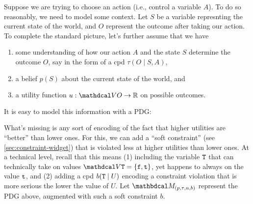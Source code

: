 Suppose we are trying to choose an action (i.e., control a variable $A$). 
To do so reasonably, we need to model some context. 
Let $S$ be a variable represnting the current state of the world,
and $O$ represent the outcome after taking our action. 
%
To complete the standard picture, let's further assume that 
 we have 
\begin{enumerate}[nosep]
\item 
    some understanding of how our action $A$ and the state $S$ determine the outcome $O$, say in the form of a cpd $\tau(O \mid S,A)$, 
\item 
a belief $p(S)$ about the current state of the world,
and 
\item  a utility function $u : \V O \to \mathbb R$ on possible outcomes. 
\end{enumerate}
It is easy to model this information with a PDG:

\begin{center}
\end{center}


What's missing is any sort of encoding of the fact that higher utilities
are ``better'' than lower ones. 
For this, we can add a ``soft constraint'' (see \cref{sec:constraint-widget}) that is violated less at higher utilities than lower ones.
At a technical level, recall that this means 
(1) including the variable ${\tt T}$ that can technically take on values $\V \Tru = \{ \truf, \trut\}$, yet happens to always on the value ${\tt t}$,
and  
(2) adding a cpd $b({\tt T} \mid U)$ encoding a constraint violation that is more serious the lower the value of $U$. 
Let 
$\dg M_{(p, \tau, u, b)}$
represent the PDG above, augmented with such a soft constraint $b$. 

